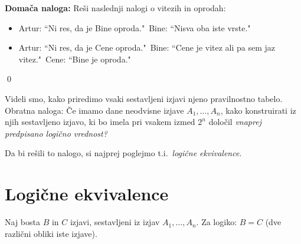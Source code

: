 \documentclass[11pt,paper=b5,footinclude,headinclude]{scrbook} %
\def\cee {{~\Leftrightarrow~}}
\begin{document}
\medskip

\textbf{ Domača naloga:} Reši naslednji nalogi o vitezih in oprodah:
\begin{itemize}
  \item Artur: ``Ni res, da je Bine oproda."~Bine: ``Nisva oba iste vrste."
  \item Artur: ``Ni res, da je Cene oproda."~Bine: ``Cene je vitez ali pa sem jaz vitez."~Cene: ``Bine je oproda."
\end{itemize}
\qed


Videli smo, kako priredimo vsaki sestavljeni izjavi njeno pravilnostno tabelo.
Obratna naloga: Če imamo dane neodvisne izjave $A_1,\ldots, A_n$,
kako konstruirati iz njih sestavljeno izjavo, ki bo imela
pri vsakem izmed $2^n$ določil {\em vnaprej predpisano logično vrednost?}

Da bi rešili to nalogo, si najprej poglejmo t.i.~{\em logične ekvivalence}.

\section{Logične ekvivalence}

Naj bosta $B$ in $C$ izjavi, sestavljeni iz izjav $A_1,\ldots, A_n$.
\iftoggle{long}{
{\color{blue}
Če je izjava $B\cee C$ tavtologija, pravimo, da sta $B$ in $C$ {\em logično ekvivalentni}.
}
}
{
Če je izjava $B\cee C$ tavtologija, pravimo, da sta $B$ in $C$ {\em logično ekvivalentni}.
}
Za logiko: $B = C$ (dve  različni obliki iste izjave).
\end{document}
